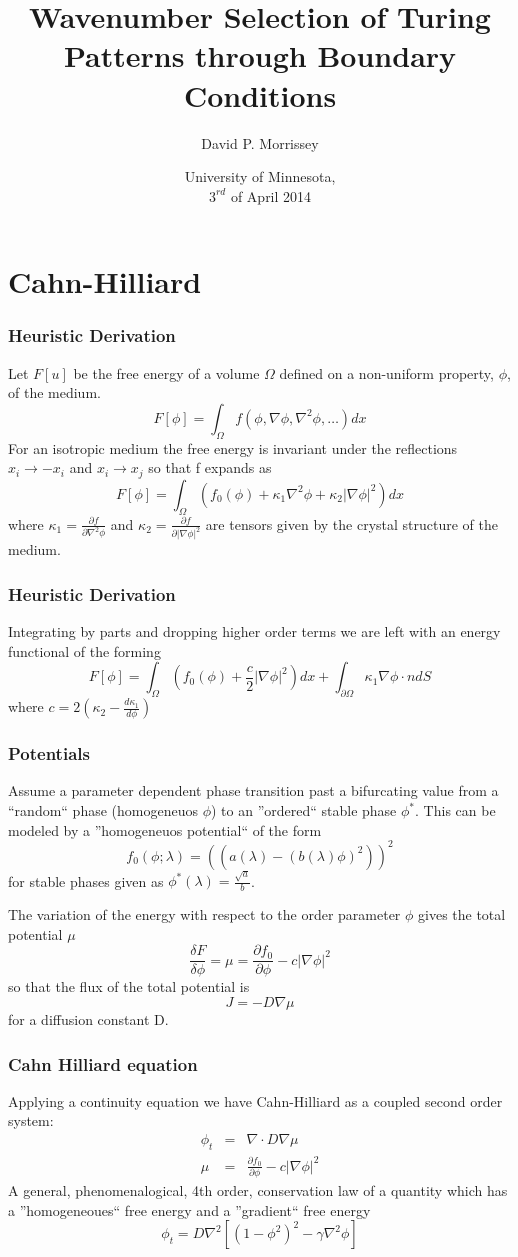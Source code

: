 \documentclass{beamer}
\title[Variational Patterns]{Wavenumber Selection of Turing Patterns through Boundary Conditions}
\author[DPM]{David P. Morrissey}
\date[17-May-12]{University of Minnesota, \\$3^{rd}$ of April 2014}
\begin{document}
\frame{\titlepage}

\section{Cahn-Hilliard}

\begin{frame}
\frametitle{Heuristic Derivation}
Let $F[u]$ be the free energy of a volume $\Omega$ defined on a non-uniform property, $\phi$, of the medium.
\[
 F[\phi] = \int_\Omega f(\phi, \nabla\phi, \nabla^2\phi, \ldots) dx
\]
\pause
For an isotropic medium the free energy is invariant under the reflections $x_i \rightarrow -x_i$ and $x_i \rightarrow x_j$ so that f expands as
\[
 F[\phi] = \int_\Omega \left ( f_0(\phi) + \kappa_1 \nabla^2\phi + \kappa_2 |\nabla\phi|^2 \right) dx
\]
where $\kappa_1 = \frac{\partial f}{\partial\nabla^2\phi}$ and $\kappa_2 = \frac{\partial f}{\partial  |\nabla \phi|^2}$ are tensors given by the crystal structure of the medium.

\end{frame}

\begin{frame}
\frametitle{Heuristic Derivation}
Integrating by parts and dropping higher order terms we are left with an energy functional of the forming
\[
 F[\phi] = \int_\Omega \left ( f_0(\phi) + \frac{c}{2}|\nabla\phi|^2 \right) dx + \int_{\partial \Omega} \kappa_1 \nabla\phi\cdot n dS
\]
where $c = 2(\kappa_2 - \frac{d\kappa_1}{d\phi})$
\end{frame}

\begin{frame}
 \frametitle{Potentials}
Assume a parameter dependent phase transition past a bifurcating value from a ``random`` phase (homogeneuos $\phi$) to an ''ordered`` stable phase $\phi^*$.  
This can be modeled by a ''homogeneuos potential`` of the form
\[
 f_0(\phi ; \lambda) = \left ( (a(\lambda) - (b(\lambda) \phi)^2 )\right )^2
\]
for stable phases given as $\phi^*(\lambda) = \frac{\sqrt{a}}{b}$.


\pause
The variation of the energy with respect to the order parameter $\phi$ gives the total potential $\mu$
\[
\frac{\delta F}{\delta \phi} = \mu = \frac{\partial f_0}{\partial \phi} - c|\nabla\phi|^2
\]
\pause
so that the flux of the total potential is 
\[
 J = -D\nabla \mu
\]
for a diffusion constant D.
\end{frame}

\begin{frame}
\frametitle{Cahn Hilliard equation}
Applying a continuity equation we have Cahn-Hilliard as a coupled second order system:
\begin{eqnarray*}
 \phi_t &=& \nabla \cdot D\nabla\mu \\
 \mu &=& \frac{\partial f_0}{\partial \phi} - c|\nabla\phi|^2
\end{eqnarray*}
\pause
A general, phenomenalogical, 4th order, conservation law of a quantity which has a ''homogeneoues`` free energy and a ''gradient`` free energy
\[
 \phi_t = D\nabla^2[(1-\phi^2)^2 - \gamma \nabla^2 \phi ]
\]
\end{frame}
\end{document}
